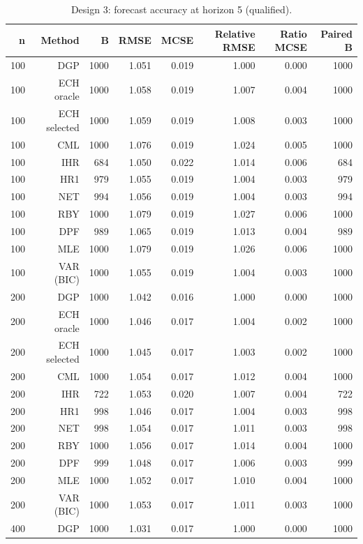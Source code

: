 \begin{table}[p]\centering
\caption{Design 3: forecast accuracy at horizon 5 (qualified).}
\small
\begin{tabular}{rrrrrrrr}\toprule
n & Method & B & RMSE & MCSE & Relative RMSE & Ratio MCSE & Paired B \\\midrule
100 & DGP & 1000 & 1.051 & 0.019 & 1.000 & 0.000 & 1000 \\
100 & ECH oracle & 1000 & 1.058 & 0.019 & 1.007 & 0.004 & 1000 \\
100 & ECH selected & 1000 & 1.059 & 0.019 & 1.008 & 0.003 & 1000 \\
100 & CML & 1000 & 1.076 & 0.019 & 1.024 & 0.005 & 1000 \\
100 & IHR &  684 & 1.050 & 0.022 & 1.014 & 0.006 &  684 \\
100 & HR1 &  979 & 1.055 & 0.019 & 1.004 & 0.003 &  979 \\
100 & NET &  994 & 1.056 & 0.019 & 1.004 & 0.003 &  994 \\
100 & RBY & 1000 & 1.079 & 0.019 & 1.027 & 0.006 & 1000 \\
100 & DPF &  989 & 1.065 & 0.019 & 1.013 & 0.004 &  989 \\
100 & MLE & 1000 & 1.079 & 0.019 & 1.026 & 0.006 & 1000 \\
100 & VAR (BIC) & 1000 & 1.055 & 0.019 & 1.004 & 0.003 & 1000 \\
200 & DGP & 1000 & 1.042 & 0.016 & 1.000 & 0.000 & 1000 \\
200 & ECH oracle & 1000 & 1.046 & 0.017 & 1.004 & 0.002 & 1000 \\
200 & ECH selected & 1000 & 1.045 & 0.017 & 1.003 & 0.002 & 1000 \\
200 & CML & 1000 & 1.054 & 0.017 & 1.012 & 0.004 & 1000 \\
200 & IHR &  722 & 1.053 & 0.020 & 1.007 & 0.004 &  722 \\
200 & HR1 &  998 & 1.046 & 0.017 & 1.004 & 0.003 &  998 \\
200 & NET &  998 & 1.054 & 0.017 & 1.011 & 0.003 &  998 \\
200 & RBY & 1000 & 1.056 & 0.017 & 1.014 & 0.004 & 1000 \\
200 & DPF &  999 & 1.048 & 0.017 & 1.006 & 0.003 &  999 \\
200 & MLE & 1000 & 1.052 & 0.017 & 1.010 & 0.004 & 1000 \\
200 & VAR (BIC) & 1000 & 1.053 & 0.017 & 1.011 & 0.003 & 1000 \\
400 & DGP & 1000 & 1.031 & 0.017 & 1.000 & 0.000 & 1000 \\

\end{tabular}
\end{table}
